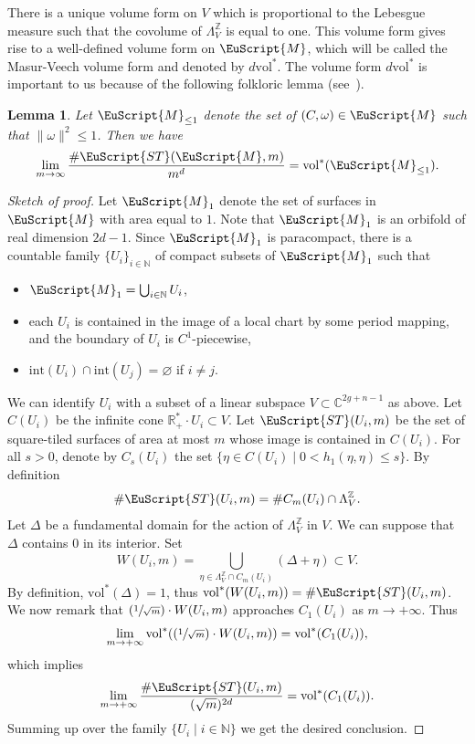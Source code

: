 \documentclass[10pt]{amsart}
\let\mathcal\EuScript
\newcommand{\Psfrac}[2]{(\sfrac{#1}{#2})}
\theoremstyle{plain}
\newtheorem{Lemma}[Theorem]{Lemma}
\theoremstyle{definition}
\newcommand{\R}{\mathbb{R}}
\def\C{\mathbb{C}}
\newcommand\Z{\mathbb{Z}}
\newcommand{\N}{\mathbb{N}}
\newcommand{\Mcal}{\mathcal{M}}
\newcommand{\cM}{\mathcal{M}}
\newcommand{\ST}{\mathcal{ST}}
\newcommand{\inter}{\mathrm{int}}
\newcommand{\vol}{\mathrm{vol}}
\begin{document}
There is a unique volume form on $V$ which is proportional to the Lebesgue measure such that the covolume of $\Lambda^\Z_V$ is equal to one.
This volume form gives rise to a well-defined volume form on $\Mcal$, which will be called the Masur-Veech volume form and denoted by $d\vol^*$.
The volume form $d\vol^*$ is important to us because of the following folkloric lemma (see~\cite[Prop.\,1.6]{EO01}).

\begin{Lemma}\label{lm:MV:vol:count}
Let $\Mcal_{\leq 1}$ denote the set of $(C,\omega)\in \Mcal$ such that $\|\omega\|^2\leq 1$. Then we have
\[
\lim_{m\to \infty}\frac{\#\ST(\Mcal,m)}{m^d}=\vol^*(\Mcal_{\leq 1}).
\]
\end{Lemma}
\begin{proof}[Sketch of proof]
Let $\cM_1$ denote the set of surfaces in $\cM$ with area equal to $1$. Note that $\cM_1$ is an orbifold of real dimension $2d-1$.
Since $\cM_1$ is paracompact, there is a countable family $\{U_i\}_{i\in \N}$ of compact subsets of $\cM_1$ such that
\begin{itemize}
\item
$\cM_1=\bigcup_{i\in \N}U_i$,

\item
each $U_i$ is contained in the image of a local chart by some period mapping, and the boundary of $U_i$ is $C^1$-piecewise,

\item
$\inter(U_i)\cap\inter(U_j)=\varnothing$ if $i\neq j$.
\end{itemize}
We can identify $U_i$ with a subset of a linear subspace $V\subset \C^{2g+n-1}$ as above.
Let $C(U_i)$ be the infinite cone $\R^*_+\cdot U_i \subset V$.
Let $\ST(U_i,m)$ be the set of square-tiled surfaces of area at most $m$ whose image is contained in $C(U_i)$.
For all $s >0$, denote by $C_s(U_i)$ the set $\{\eta \in C(U_i)\mid 0< h_1(\eta,\eta) \leq s\}$.
By definition
\[
\#\ST(U_i,m)=\#C_m(U_i)\cap\Lambda^\Z_V.
\]
Let $\Delta$ be a fundamental domain for the action of $\Lambda^\Z_V$ in $V$.
We can suppose that $\Delta$ contains $0$ in its interior.
Set
\[
W(U_i,m)=\bigcup_{\eta\in\Lambda^{\Z}_V\cap C_{m}(U_i)}(\Delta+\eta) \subset V.
\]
By definition, $\vol^*(\Delta)=1$, thus $\vol^*(W(U_i,m))=\#\ST(U_i,m)$.
We now remark that $\Psfrac{1}{\sqrt{m}}\cdot W(U_i,m)$ approaches $C_1(U_i)$ as $m \to +\infty$. Thus
\[
\lim_{m \to +\infty}\vol^*(\Psfrac{1}{\sqrt{m}}\cdot W(U_i,m))= \vol^*(C_{1}(U_i)),
\]
which implies
\[
\lim_{m\to +\infty}\frac{\#\ST(U_i,m)}{(\sqrt{m})^{2d}}=\vol^*(C_1(U_i)).
\]
Summing up over the family $\{U_i\mid i \in \N\}$ we get the desired conclusion.
\end{proof}
\end{document}
